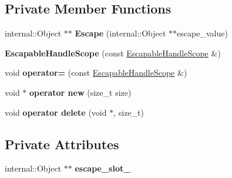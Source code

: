 \subsection*{Private Member Functions}
\begin{DoxyCompactItemize}
\item 
internal\+::\+Object $\ast$$\ast$ {\bfseries Escape} (internal\+::\+Object $\ast$$\ast$escape\+\_\+value)\hypertarget{classv8_1_1_escapable_handle_scope_a1492c25961a2ccff3ba194f70139b2bc}{}\label{classv8_1_1_escapable_handle_scope_a1492c25961a2ccff3ba194f70139b2bc}

\item 
{\bfseries Escapable\+Handle\+Scope} (const \hyperlink{classv8_1_1_escapable_handle_scope}{Escapable\+Handle\+Scope} \&)\hypertarget{classv8_1_1_escapable_handle_scope_a3e313c7cf1656a443d947303c3220931}{}\label{classv8_1_1_escapable_handle_scope_a3e313c7cf1656a443d947303c3220931}

\item 
void {\bfseries operator=} (const \hyperlink{classv8_1_1_escapable_handle_scope}{Escapable\+Handle\+Scope} \&)\hypertarget{classv8_1_1_escapable_handle_scope_a3fbf3f11d4089d8a730d4171bf8f1bed}{}\label{classv8_1_1_escapable_handle_scope_a3fbf3f11d4089d8a730d4171bf8f1bed}

\item 
void $\ast$ {\bfseries operator new} (size\+\_\+t size)\hypertarget{classv8_1_1_escapable_handle_scope_adf445b7a17fe29a93c9524fe72b65b28}{}\label{classv8_1_1_escapable_handle_scope_adf445b7a17fe29a93c9524fe72b65b28}

\item 
void {\bfseries operator delete} (void $\ast$, size\+\_\+t)\hypertarget{classv8_1_1_escapable_handle_scope_a082688365df2e134a510dd3bc67629af}{}\label{classv8_1_1_escapable_handle_scope_a082688365df2e134a510dd3bc67629af}

\end{DoxyCompactItemize}
\subsection*{Private Attributes}
\begin{DoxyCompactItemize}
\item 
internal\+::\+Object $\ast$$\ast$ {\bfseries escape\+\_\+slot\+\_\+}\hypertarget{classv8_1_1_escapable_handle_scope_aa452d2cad22ccec2675174e01526d025}{}\label{classv8_1_1_escapable_handle_scope_aa452d2cad22ccec2675174e01526d025}

\end{DoxyCompactItemize}
